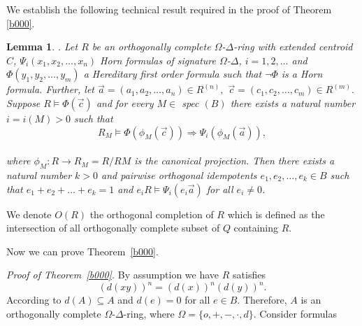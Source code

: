 \documentclass[12pt]{amsart}
\newtheorem{lem}[thm]{Lemma}
\theoremstyle{definition}
\theoremstyle{remark}
\begin{document}
\noindent
 We establish the following technical result required
 in the proof of Theorem \ref{b000}.

\begin{lem}\label{c}
 \cite[Theorem 3.2.18]{a0}. Let $R$ be an orthogonally complete
 $\Omega$-$\Delta$-ring with extended centroid $C$,
 $\Psi_{i} ( x_{1}, x_{2},\ldots, x_{n})$ Horn formulas of signature
 $\Omega$-$\Delta$, $i=1,2,\ldots$ and
 $\Phi(y_{1}, y_{2},\ldots,y_{m})$
 a Hereditary first order formula such that $\neg\Phi$ is
 a Horn formula.
 Further, let
 $\vec{a}= (a_{1}, a_{2},\ldots,a_{n})\in R^{(n)},$
 $\vec{c} = (c_{1}, c_{2},\ldots, c_{m})\in R^{(m)}.$
 Suppose  $R\models \Phi (\vec{c})$ and  for
 every $M\in$ spec $(B)$ there exists a natural number
 $i=i(M)>0$ such that
 $$R_{M} \models \Phi (\phi_{M} (\vec{c})) \Longrightarrow \Psi_{i}(\phi_{M}(\vec{a})),$$\\
  where $\phi_{M}: R\rightarrow R_{M} = R/RM$ is the
  canonical projection. Then there exists a natural number
  $k > 0$ and pairwise orthogonal idempotents
  $e_{1}, e_{2},\ldots,e_{k}\in B$ such that
  $e_{1} + e_{2} + \ldots + e_{k} = 1$ and $e_{i}R\models\Psi_{i}(e_{i}\vec{a})$
  for all $e_{i}\neq 0$.
 \end{lem}

 \noindent
 We denote $O(R)$ the orthogonal completion of $R$
 which is defined as the intersection of all
 orthogonally complete subset of $Q$ containing $R$.
 

\smallskip
\noindent
 Now we can prove Theorem~\ref{b000}.

\vspace{3mm}
\emph{Proof of Theorem~\ref{b000}.}
  By  assumption we have $R$  satisfies
 $$(d(xy))^n=(d(x))^n(d(y))^n.$$
 According to \cite[Theorem 3.1.16]{a0} $d(A)\subseteq A$
 and $d(e)=0$ for all $e\in B.$ Therefore,
 $A$ is an orthogonally complete $\Omega$-$\Delta$-ring,
 where $\Omega= \{o, +, -, \cdot, d \}$.
 Consider formulas
\end{document}
